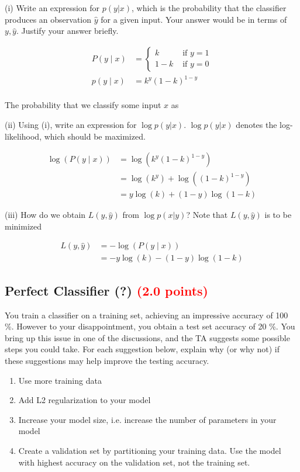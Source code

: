 \documentclass[answers]{exam}
\newcommand{\mypoints}[1]{\textcolor{red}{(#1 points)}}
\begin{document}
(i) Write an expression for $p(y|x)$, which is the probability that the classifier produces an observation $\hat{y}$ for a given input. Your answer would be in terms of $y, \hat{y}$. Justify your answer briefly. 
\begin{solution}
\begin{align}
P(y \mid x)&=\left\{\begin{array}{ll}
k & \text { if } y=1 \\
1-k & \text { if } y=0
\end{array}\right. \\
p(y \mid x)&=k^{y}(1-k)^{1-y}\\
\end{align}

The probability that we classify some input $x$ as 

\end{solution}
(ii) Using (i), write an expression for $\log p(y|x)$. $\log p(y|x)$ denotes the log-likelihood, which should be maximized.
\begin{solution}
\begin{align}
\log (P(y \mid x)) &=\log \left(k^{y}(1-k)^{1-y}\right) \\
&=\log \left(k^{y}\right)+\log \left((1-k)^{1-y}\right) \\
&=y \log (k)+(1-y) \log (1-k)
\end{align}
\end{solution}
(iii) How do we obtain $L(y, \hat{y})$ from $\log p(x|y)$? Note that $L(y, \hat{y})$ is to be minimized 
\begin{solution}
\begin{align}
L(y, \hat{y}) &=-\log (P(y \mid x)) \\
&=-y \log (k)-(1-y) \log (1-k)
\end{align}
\end{solution}

\subsection{ Perfect Classifier (?) \mypoints{2.0}}

You train a classifier on a training set, achieving an impressive accuracy of 100 \%. However to your disappointment, you obtain a test set accuracy of 20 \%. You bring up this issue in one of the discussions, and the TA suggests some possible steps you could take. For each suggestion below, explain why (or why not) if these suggestions may help improve the testing accuracy.
\begin{enumerate}
    \item Use more training data
    \item Add L2 regularization to your model
    \item Increase your model size, i.e. increase the number of parameters in your model
    \item Create a validation set by partitioning your training data. Use the model with highest accuracy on the validation set, not the training set. 
\end{enumerate}
\end{document}
